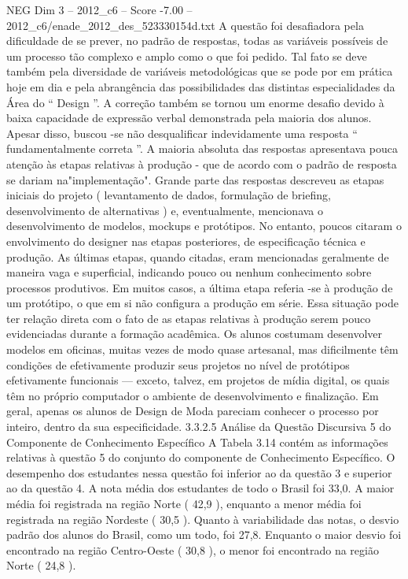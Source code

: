 \begin{textsample}{NEG Dim 3 – 2012\_c6 – Score -7.00 – 2012\_c6/enade\_2012\_des\_523330154d.txt}
A questão foi desafiadora pela dificuldade de se prever, no padrão de respostas, todas as variáveis possíveis de um processo tão complexo e amplo como o que foi pedido.
Tal fato se deve também pela diversidade de variáveis metodológicas que se pode por em prática hoje em dia e pela abrangência das possibilidades das distintas especialidades da Área do “ Design ”.
A correção também se tornou um enorme desafio devido à baixa capacidade de expressão verbal demonstrada pela maioria dos alunos.
Apesar disso, buscou -se não desqualificar indevidamente uma resposta “ fundamentalmente correta ”.
A maioria absoluta das respostas apresentava pouca atenção às etapas relativas à produção - que de acordo com o padrão de resposta se dariam na"implementação".
Grande parte das respostas descreveu as etapas iniciais do projeto ( levantamento de dados, formulação de briefing, desenvolvimento de alternativas ) e, eventualmente, mencionava o desenvolvimento de modelos, mockups e protótipos.
No entanto, poucos citaram o envolvimento do designer nas etapas posteriores, de especificação técnica e produção.
As últimas etapas, quando citadas, eram mencionadas geralmente de maneira vaga e superficial, indicando pouco ou nenhum conhecimento sobre processos produtivos.
Em muitos casos, a última etapa referia -se à produção de um protótipo, o que em si não configura a produção em série.
Essa situação pode ter relação direta com o fato de as etapas relativas à produção serem pouco evidenciadas durante a formação acadêmica.
Os alunos costumam desenvolver modelos em oficinas, muitas vezes de modo quase artesanal, mas dificilmente têm condições de efetivamente produzir seus projetos no nível de protótipos efetivamente funcionais — exceto, talvez, em projetos de mídia digital, os quais têm no próprio computador o ambiente de desenvolvimento e finalização.
Em geral, apenas os alunos de Design de Moda pareciam conhecer o processo por inteiro, dentro da sua especificidade. 3.3.2.5 Análise da Questão Discursiva 5 do Componente de Conhecimento Específico A Tabela 3.14 contém as informações relativas à questão 5 do conjunto do componente de Conhecimento Específico.
O desempenho dos estudantes nessa questão foi inferior ao da questão 3 e superior ao da questão 4.
A nota média dos estudantes de todo o Brasil foi 33,0.
A maior média foi registrada na região Norte ( 42,9 ), enquanto a menor média foi registrada na região Nordeste ( 30,5 ).
Quanto à variabilidade das notas, o desvio padrão dos alunos do Brasil, como um todo, foi 27,8.
Enquanto o maior desvio foi encontrado na região Centro-Oeste ( 30,8 ), o menor foi encontrado na região Norte ( 24,8 ).

\end{textsample}
